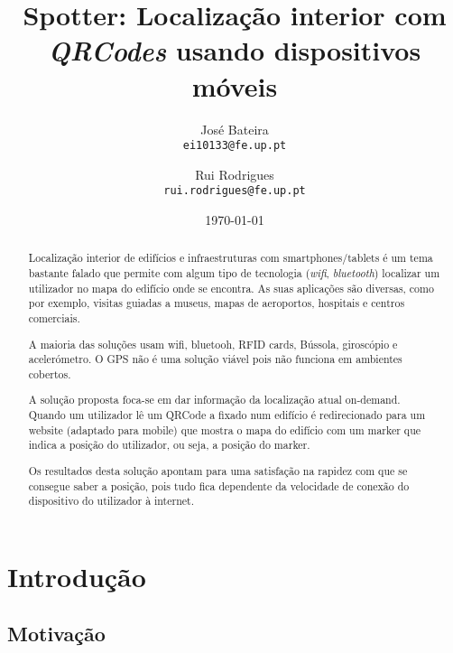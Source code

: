 \documentclass[twocolumn,twoside,11pt]{article}
\title{\vspace{-15mm}\fontsize{24pt}{10pt}\selectfont\textbf{
  Spotter: Localização interior com \emph{QRCodes} usando dispositivos móveis
}} %
\author{José Bateira\\
\small \texttt{ei10133@fe.up.pt}\\
\and
Rui Rodrigues\\
\small \texttt{rui.rodrigues@fe.up.pt}
\vspace{-5mm}
}
\date{\today}
\begin{document}
\maketitle
\thispagestyle{plain}            %


\begin{abstract}
Localização interior de edifícios e infraestruturas com smartphones/tablets é um tema bastante falado que permite com algum tipo de tecnologia (\emph{wifi}, \emph{bluetooth}) localizar um utilizador no mapa do edifício onde se encontra.
As suas aplicações são diversas, como por exemplo, visitas guiadas a museus, mapas de aeroportos, hospitais e centros comerciais.

A maioria das soluções usam wifi, bluetooh, RFID cards, Bússola, giroscópio e acelerómetro.
O GPS não é uma solução viável pois não funciona em ambientes cobertos.

A solução proposta foca-se em dar informação da localização atual on-demand. Quando um utilizador lê um QRCode a fixado num edifício é redirecionado para um website (adaptado para mobile) que mostra o mapa do edifício com um marker que indica a posição do utilizador, ou seja, a posição do marker.

Os resultados desta solução apontam para uma satisfação na rapidez com que se consegue saber a posição, pois tudo fica dependente da velocidade de conexão do dispositivo do utilizador à internet.
\end{abstract}


\section{Introdução}\label{sec:intro}

\lipsum[3]

\subsection{Motivação} %
\label{sub:motivacao}
\lipsum[1]
\end{document}
